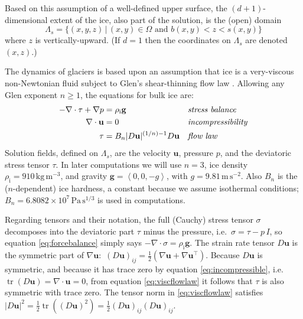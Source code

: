 \documentclass[letterpaper,final,12pt,reqno]{amsart}
\theoremstyle{claim}
\newcommand{\grad}{\nabla}
\newcommand{\Div}{\nabla\cdot}
\newcommand{\trace}{\operatorname{tr}}
\newcommand{\bg}{\mathbf{g}}
\newcommand{\bu}{\mathbf{u}}
\newcommand{\rhoi}{\rho_{\text{i}}}
\numberwithin{equation}{section}
\numberwithin{figure}{section}
\numberwithin{table}{section}
\numberwithin{theorem}{section}
\begin{document}
Based on this assumption of a well-defined upper surface, the $(d+1)$-dimensional extent of the ice, also part of the solution, is the (open) domain
\begin{equation}
\Lambda_s = \{(x,y,z)\,|\,(x,y) \in \Omega \text{ and } b(x,y) < z < s(x,y)\} \label{eq:lambdas}
\end{equation}
where $z$ is vertically-upward.  (If $d=1$ then the coordinates on $\Lambda_s$ are denoted $(x,z)$.)

The dynamics of glaciers is based upon an assumption that ice is a very-viscous non-Newtonian fluid subject to Glen's shear-thinning flow law \cite{GreveBlatter2009}.  Allowing any Glen exponent $n\ge 1$, the equations \cite[Chapter 1]{FowlerNg2021} for bulk ice are:
\begin{align}
- \nabla \cdot \tau + \nabla p &= \rhoi \bg &&\text{\emph{stress balance}} \label{eq:forcebalance} \\
\nabla \cdot \bu &= 0 &&\text{\emph{incompressibility}} \label{eq:incompressible} \\
\tau &= B_n |D\bu|^{(1/n) - 1} D\bu  &&\text{\emph{flow law}} \label{eq:viscflowlaw}
\end{align}
Solution fields, defined on $\Lambda_s$, are the velocity $\bu$, pressure $p$, and the deviatoric stress tensor $\tau$.  In later computations we will use $n=3$, ice density $\rhoi=910 \,\text{kg}\,\text{m}^{-3}$, and gravity $\bg=\left<0,0,-g\right>$, with $g=9.81\,\text{m}\,\text{s}^{-2}$.  Also $B_n$ is the ($n$-dependent) ice hardness, a constant because we assume isothermal conditions; $B_n=6.8082\times 10^7\,\text{Pa}\,\text{s}^{1/3}$ is used in computations.

Regarding tensors and their notation, the full (Cauchy) stress tensor $\sigma$ \cite{GreveBlatter2009} decomposes into the deviatoric part $\tau$ minus the pressure, i.e.~$\sigma = \tau - p\,I$, so equation \eqref{eq:forcebalance} simply says $-\Div \sigma = \rhoi \bg$.  The strain rate tensor $D\bu$ is the symmetric part of $\grad \bu$: \,$(D\bu)_{ij} = \frac{1}{2} \left(\grad\bu + \grad\bu^\top\right)$.  Because $D\bu$ is symmetric, and because it has trace zero by equation \eqref{eq:incompressible}, i.e.~$\trace(D\bu)=\nabla \cdot \bu = 0$, from equation \eqref{eq:viscflowlaw} it follows that $\tau$ is also symmetric with trace zero.  The tensor norm in \eqref{eq:viscflowlaw} satisfies $|D\bu|^2 = \frac{1}{2} \trace\left((D\bu)^2\right) = \frac{1}{2} (D\bu)_{ij} (D\bu)_{ij}$.
\end{document}
